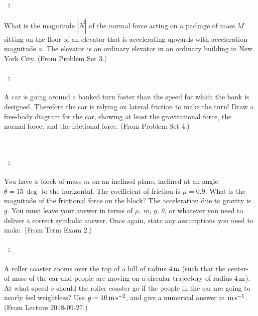 \documentclass[12pt]{article} 
\begin{document}
\vfill

\paragraph{\problemname~\theproblem:}%
What is the magnitude $|\vec{N}|$ of the normal force acting on a package of
mass $M$ sitting on the floor of an elevator that is accelerating
upwards with acceleration magnitude $a$. The elevator is an ordinary
elevator in an ordinary building in New York City.
(From Problem Set 3.)

\vfill

\paragraph{\problemname~\theproblem:}%
A car is going around a banked turn faster than the speed for which
the bank is designed. Therefore the car is relying on lateral friction
to make the turn!  Draw a free-body diagram for the car, showing at
least the gravitational force, the normal force, and the frictional
force.
(From Problem Set 4.)

\vfill
~
\clearpage

\paragraph{\problemname~\theproblem:}%
You have a block of mass $m$ on an inclined plane, inclined at an
angle $\theta=15\,\deg$ to the horizontal. The coefficient of friction
is $\mu=0.9$. What is the magnitude of the frictional force on the
block? The acceleration due to gravity is $g$.
You must leave your answer in terms of $\mu$, $m$, $g$, $\theta$, or
whatever you need to deliver a correct symbolic answer.
Once again, state any assumptions you need to make.
(From Term Exam 2.)

\vfill

\paragraph{\problemname~\theproblem:}%
A roller coaster zooms over the top of a hill of radius $4\,\mathrm{m}$ (such that the
center-of-mass of the car and people are moving on a circular trajectory of
radius $4\,\mathrm{m}$). At what speed $v$ should the roller coaster go if the people in
the car are going to nearly feel weightless? Use $g=10\,\mathrm{m}\,\mathrm{s}^{-2}$, and give
a numerical answer in $\mathrm{m}\,\mathrm{s}^{-1}$.
(From Lecture 2018-09-27.)
\end{document}
